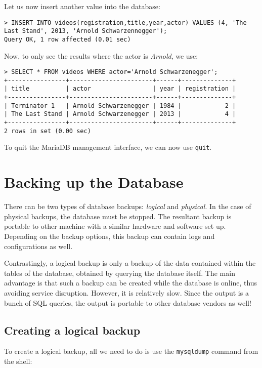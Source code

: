 \noindent
Let us now insert another value into the database:

\vspace{-15pt}
\begin{verbatim}
> INSERT INTO videos(registration,title,year,actor) VALUES (4, 'The Last Stand', 2013, 'Arnold Schwarzennegger');
Query OK, 1 row affected (0.01 sec)
\end{verbatim}
\vspace{-10pt}	

\noindent
Now, to only see the results where the actor is \textit{Arnold}, we use:

\vspace{-15pt}
\begin{verbatim}
> SELECT * FROM videos WHERE actor='Arnold Schwarzenegger';
+----------------+-----------------------+------+--------------+
| title          | actor                 | year | registration |
+----------------+-----------------------+------+--------------+
| Terminator 1   | Arnold Schwarzenegger | 1984 |            2 |
| The Last Stand | Arnold Schwarzenegger | 2013 |            4 |
+----------------+-----------------------+------+--------------+
2 rows in set (0.00 sec)
\end{verbatim}
\vspace{-10pt}	

\noindent
To quit the MariaDB management interface, we can now use \verb|quit|. 

\section{Backing up the Database}
There can be two types of database backups: \textit{logical} and \textit{physical}. In the case of physical backups, the database must be stopped. The resultant backup is portable to other machine with a similar hardware and software set up. Depending on the backup options, this backup can contain logs and configurations as well. 

Contrastingly, a logical backup is only a backup of the data contained within the tables of the database, obtained by querying the database itself. The main advantage is that such a backup can be created while the database is online, thus avoiding service disruption. However, it is relatively slow. Since the output is a bunch of SQL queries, the output is portable to other database vendors as well!

\subsection{Creating a logical backup}
To create a logical backup, all we need to do is use the \verb|mysqldump| command from the shell:

